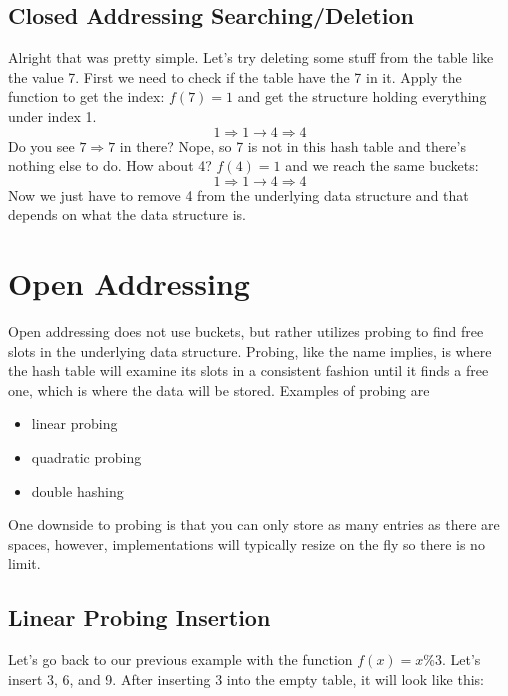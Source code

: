 \documentclass[11pt]{book}
\begin{document}
	\subsection{Closed Addressing Searching/Deletion}
		\noindent Alright that was pretty simple. Let's try deleting some stuff from the
		table like the value 7. First we need to check if the table have the 7 in it.
		Apply the function to get the index: $f(7) = 1$ and get the structure holding
		everything under index 1.
		\[
			1 \Rightarrow 1 \rightarrow 4 \Rightarrow 4
		\]
		\noindent Do you see $7 \Rightarrow 7$ in there? Nope, so 7 is not in this hash table and
		there's nothing else to do. How about 4? $f(4) = 1$ and we reach the same buckets:
		\[
			1 \Rightarrow 1 \rightarrow 4 \Rightarrow 4
		\]
		\noindent Now we just have to remove 4 from the underlying data structure and that
		depends on what the data structure is.

	\section{Open Addressing}
		Open addressing does not use buckets, but rather utilizes probing to find free
		slots in the underlying data structure. Probing, like the name implies, is where
		the hash table will examine its slots in a consistent fashion until it finds a
		free one, which is where the data will be stored. Examples of probing are
		\begin{itemize}
			\item linear probing
			\item quadratic probing
			\item double hashing
		\end{itemize}
		One downside to probing is that you can only store as many entries as there are
		spaces, however, implementations will typically resize on the fly so there is
		no limit.

	\subsection{Linear Probing Insertion}
		Let's go back to our previous example with the function $f(x) = x \% 3$. Let's
		insert 3, 6, and 9. After inserting 3 into the empty table, it will look like this:

		\begin{center}
		\end{center}
\end{document}
